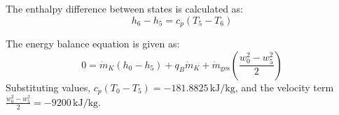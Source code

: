 The enthalpy difference between states is calculated as:  
\[
h_6 - h_5 = c_p \left( T_5 - T_6 \right)
\]  

The energy balance equation is given as:  
\[
0 = \dot{m}_K \left( h_0 - h_5 \right) + q_B \dot{m}_K + \dot{m}_{\text{ges}} \left( \frac{w_0^2 - w_5^2}{2} \right)
\]  
Substituting values, \( c_p \left( T_0 - T_5 \right) = -181.8825 \, \text{kJ/kg} \), and the velocity term \( \frac{w_0^2 - w_5^2}{2} = -9200 \, \text{kJ/kg} \).